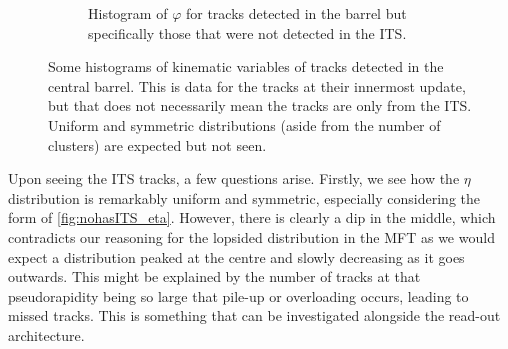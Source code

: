\begin{figure}[h]
\begin{subfigure}[t]{.49\linewidth}
        \caption{Histogram of $\varphi$ for tracks detected in the barrel but specifically those that were not detected in the ITS.}
        \label{fig:nohasITS_phi_no_ITS}
    \end{subfigure}
\caption[Histograms of $\eta$, $\varphi$, and ITS inner barrel  for tracks in the central barrel]{Some histograms of kinematic variables of tracks detected in the central barrel. This is data for the tracks at their innermost update, but that does not necessarily mean the tracks are only from the ITS. Uniform and symmetric distributions (aside from the number of clusters) are expected but not seen.}
\label{fig:ITS_1D_nohasITS}
\end{figure}

Upon seeing the ITS tracks, a few questions arise. Firstly, we see how the $\eta$ distribution is remarkably uniform and symmetric, especially considering the form of \cref{fig:nohasITS_eta}. However, there is clearly a dip in the middle, which contradicts our reasoning for the lopsided distribution in the MFT as we would expect a distribution peaked at the centre and slowly decreasing as it goes outwards. This might be explained by the number of tracks at that pseudorapidity being so large that pile-up or overloading occurs, leading to missed tracks. This is something that can be investigated alongside the read-out architecture.

